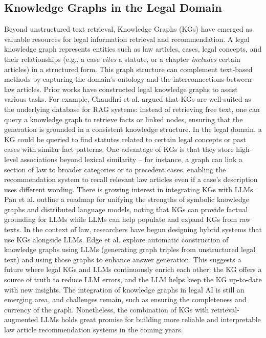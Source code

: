 \documentclass[review,times,nonatbib]{elsarticle} %
\begin{document}
\subsection{Knowledge Graphs in the Legal Domain} 
Beyond unstructured text retrieval, Knowledge Graphs (KGs) have emerged as valuable resources for legal information retrieval and recommendation. A legal knowledge graph represents entities such as law articles, cases, legal concepts, and their relationships (e.g., a case \emph{cites} a statute, or a chapter \emph{includes} certain articles) in a structured form. This graph structure can complement text-based methods by capturing the domain’s ontology and the interconnections between law articles. Prior works have constructed legal knowledge graphs to assist various tasks. For example, Chaudhri et al.\cite{chaudhri2022knowledge} argued that KGs are well-suited as the underlying database for RAG systems: instead of retrieving free text, one can query a knowledge graph to retrieve facts or linked nodes, ensuring that the generation is grounded in a consistent knowledge structure. In the legal domain, a KG could be queried to find statutes related to certain legal concepts or past cases with similar fact patterns. One advantage of KGs is that they store high-level associations beyond lexical similarity – for instance, a graph can link a section of law to broader categories or to precedent cases, enabling the recommendation system to recall relevant law articles even if a case’s description uses different wording. There is growing interest in integrating KGs with LLMs\cite{pan2024unifying}. Pan et al. \cite{pan2024unifying} outline a roadmap for unifying the strengths of symbolic knowledge graphs and distributed language models, noting that KGs can provide factual grounding for LLMs while LLMs can help populate and expand KGs from raw texts. In the context of law, researchers have begun designing hybrid systems that use KGs alongside LLMs. Edge et al.\cite{edge2024from} explore automatic construction of knowledge graphs using LLMs (generating graph triples from unstructured legal text) and using those graphs to enhance answer generation. This suggests a future where legal KGs and LLMs continuously enrich each other: the KG offers a source of truth to reduce LLM errors, and the LLM helps keep the KG up-to-date with new insights. The integration of knowledge graphs in legal AI is still an emerging area, and challenges remain, such as ensuring the completeness and currency of the graph. Nonetheless, the combination of KGs with retrieval-augmented LLMs holds great promise for building more reliable and interpretable law article recommendation systems in the coming years.\\
\end{document}
